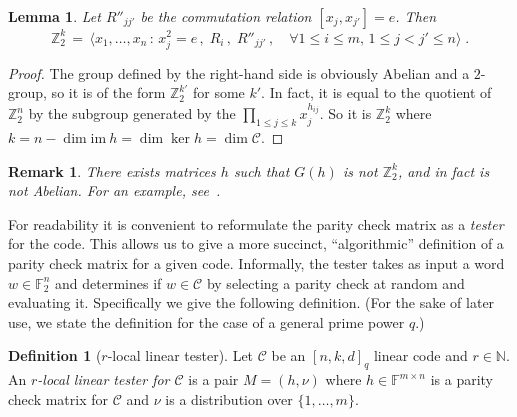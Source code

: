 \documentclass[11pt]{article}
\newtheorem{lemma}[theorem]{Lemma}
\newtheorem{remark}[theorem]{Remark}
\theoremstyle{definition}
\newtheorem{definition}[theorem]{Definition}
\newcommand{\code}{\mathscr{C}}
\newcommand{\N}{\ensuremath{\mathbb{N}}}
\newcommand{\F}{\ensuremath{\mathbb{F}}}
\newcommand{\Z}{\ensuremath{\mathbb{Z}}}
\begin{document}
\begin{lemma}\label{lem:com-code}
Let $R''_{jj'}$ be the commutation relation $[x_j,x_{j'}]=e$. Then
\[ \Z_2^k \,=\, \big\langle x_1,\ldots,x_n \,:\, x_j^2=e\,,\; R_i\,,\; R''_{jj'}\,,\quad \forall 1\leq i\leq m,\, 1\leq j< j' \leq n\big\rangle\;.\]
\end{lemma}

\begin{proof}
The group defined by the right-hand side is obviously Abelian and a $2$-group, so it is of the form $\Z_2^{k'}$ for some $k'$. In fact, it is equal to the quotient of $\Z_2^n$ by the subgroup generated by the $\prod_{1\leq j \leq k} x_j^{h_{ij}}$. So it is $\Z_2^k$ where $k=n-\dim\textrm{im}\ h = \dim\ker h=\dim \code$.  
\end{proof}

\begin{remark}
There exists matrices $h$ such that $G(h)$ is not $\Z_2^k$, and in fact is not Abelian. For an example, see~\cite[Example 2.16]{paddock2022arkhipov}.  
\end{remark}


For readability it is convenient to reformulate the parity check matrix as a \emph{tester} for the code. This allows us to give a more succinct, ``algorithmic'' definition of a parity check matrix for a given code. Informally, the tester takes as input a word $w\in \F_2^n$ and determines if $w\in \code$ by selecting a parity check at random and evaluating it. 
 Specifically we give the following definition. (For the sake of later use, we state the definition for the case of a general prime power $q$.)

\begin{definition}[$r$-local linear tester]\label{def:code-test}
Let $\code$ be an $[n,k,d]_q$ linear code and $r\in \N$.
An \emph{$r$-local linear tester for $\code$} is a pair $M = (h,\nu)$ where $h \in \F^{m \times n}$ is a parity check matrix for $\code$ and $\nu$ is a distribution over $\{1,\ldots,m\}$. 
\end{definition}
\end{document}
